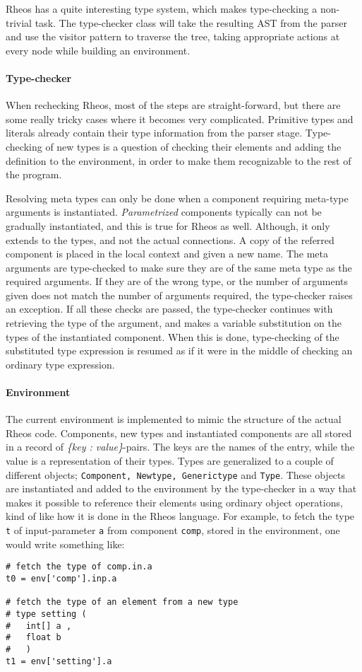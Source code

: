 Rheos has a quite interesting type system, which makes type-checking a
non-trivial task. The type-checker class will take the resulting AST
from the parser and use the visitor pattern to traverse the tree,
taking appropriate actions at every node while building an
environment.

\paragraph{Type-checker}
When rechecking Rheos, most of the steps are straight-forward, but
there are some really tricky cases where it becomes very
complicated. Primitive types and literals already contain their type
information from the parser stage. Type-checking of new types is a
question of checking their elements and adding the definition to the
environment, in order to make them recognizable to the rest of the
program.

Resolving meta types can only be done when a component requiring
meta-type arguments is instantiated. \emph{Parametrized} components
typically can not be gradually instantiated, and this is true for Rheos
as well. Although, it only extends to the types, and not the actual
connections. A copy of the referred component is placed in the local
context and given a new name. The meta arguments are type-checked to
make sure they are of the same meta type as the required arguments. If
they are of the wrong type, or the number of arguments given does not
match the number of arguments required, the type-checker raises an
exception. If all these checks are passed, the type-checker continues
with retrieving the type of the argument, and makes a variable
substitution on the types of the instantiated component. When this is
done, type-checking of the substituted type expression is resumed as if
it were in the middle of checking an ordinary type expression.


\paragraph{Environment}
The current environment is implemented to mimic the structure of the
actual Rheos code. Components, new types and instantiated components
are all stored in a record of \emph{\{key : value\}}-pairs. The keys
are the names of the entry, while the value is a representation of
their types. Types are generalized to a couple of different objects;
\texttt{Component, Newtype, Generictype} and \texttt{Type}. These
objects are instantiated and added to the environment by the
type-checker in a way that makes it possible to reference their
elements using ordinary object operations, kind of like how it is done
in the Rheos language. For example, to fetch the type \texttt{t} of
input-parameter \texttt{a} from component \texttt{comp}, stored in the
environment, one would write something like:

\begin{lstlisting}
# fetch the type of comp.in.a
t0 = env['comp'].inp.a

# fetch the type of an element from a new type
# type setting (
#   int[] a ,
#   float b
#   )
t1 = env['setting'].a
\end{lstlisting}
